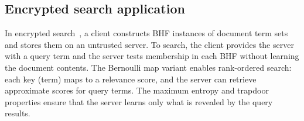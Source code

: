 \subsection{Encrypted search application}

In encrypted search~\cite{es}, a client constructs BHF instances of document
term sets and stores them on an untrusted server.
To search, the client provides the server with a query term and the server
tests membership in each BHF without learning the document contents.
The Bernoulli map variant enables rank-ordered search: each key (term) maps
to a relevance score, and the server can retrieve approximate scores for
query terms.
The maximum entropy and trapdoor properties ensure that the server learns
only what is revealed by the query results.
